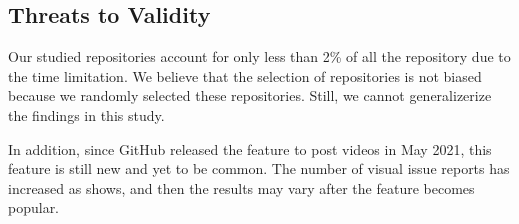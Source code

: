 \subsection{Threats to Validity}
\label{sec:limitation}

Our studied repositories account for only less than 2\% of all the repository due to the time limitation.
We believe that the selection of repositories is not biased because we randomly selected these repositories. 
Still, we cannot generalizerize the findings in this study. 

In addition, since GitHub released the feature to post videos in May 2021, this feature is still new and yet to be common. The number of visual issue reports has increased as  shows, and then the results may vary after the feature becomes popular. 

